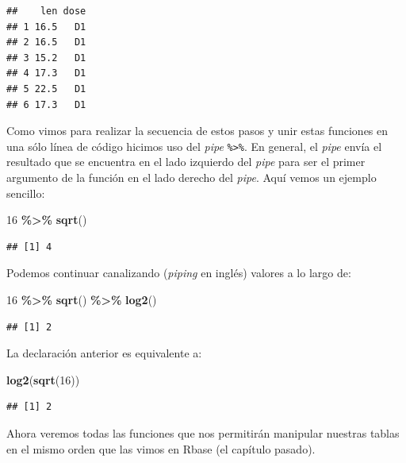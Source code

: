 \documentclass[
]{book}
\newenvironment{Shaded}{\begin{snugshade}}{\end{snugshade}}
\newcommand{\DecValTok}[1]{\textcolor[rgb]{0.00,0.00,0.81}{#1}}
\newcommand{\FunctionTok}[1]{\textcolor[rgb]{0.13,0.29,0.53}{\textbf{#1}}}
\newcommand{\NormalTok}[1]{#1}
\newcommand{\SpecialCharTok}[1]{\textcolor[rgb]{0.81,0.36,0.00}{\textbf{#1}}}
\begin{document}
\begin{verbatim}
##    len dose
## 1 16.5   D1
## 2 16.5   D1
## 3 15.2   D1
## 4 17.3   D1
## 5 22.5   D1
## 6 17.3   D1
\end{verbatim}

Como vimos para realizar la secuencia de estos pasos y unir estas funciones en una sólo línea de código hicimos uso del \emph{pipe} \texttt{\%\textgreater{}\%}.
En general, el \emph{pipe} envía el resultado que se encuentra en el lado izquierdo del \emph{pipe} para ser el primer argumento de la función en el lado derecho del \emph{pipe}.
Aquí vemos un ejemplo sencillo:

\begin{Shaded}
\begin{Highlighting}[]
\DecValTok{16} \SpecialCharTok{\%\textgreater{}\%} \FunctionTok{sqrt}\NormalTok{()}
\end{Highlighting}
\end{Shaded}

\begin{verbatim}
## [1] 4
\end{verbatim}

Podemos continuar canalizando (\emph{piping} en inglés) valores a lo largo de:

\begin{Shaded}
\begin{Highlighting}[]
\DecValTok{16} \SpecialCharTok{\%\textgreater{}\%} \FunctionTok{sqrt}\NormalTok{() }\SpecialCharTok{\%\textgreater{}\%} \FunctionTok{log2}\NormalTok{()}
\end{Highlighting}
\end{Shaded}

\begin{verbatim}
## [1] 2
\end{verbatim}

La declaración anterior es equivalente a:

\begin{Shaded}
\begin{Highlighting}[]
\FunctionTok{log2}\NormalTok{(}\FunctionTok{sqrt}\NormalTok{(}\DecValTok{16}\NormalTok{))}
\end{Highlighting}
\end{Shaded}

\begin{verbatim}
## [1] 2
\end{verbatim}

\hfill\break
Ahora veremos todas las funciones que nos permitirán manipular nuestras tablas en el mismo orden que las vimos en Rbase (el capítulo pasado).\\
\end{document}
